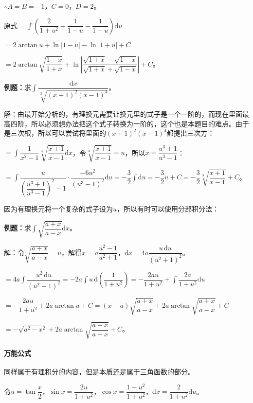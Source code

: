\documentclass[UTF8, 12pt]{ctexart}
\begin{document}
$\therefore A=B=-1$，$C=0$，$D=2$。

原式$=\displaystyle{\int\left(\dfrac{2}{1+u^2}-\dfrac{1}{1-u}-\dfrac{1}{1+u}\right)\textrm{d}u}$

$=2\arctan u+\ln\vert1-u\vert-\ln\vert1+u\vert+C$

$=2\arctan\sqrt{\dfrac{1-x}{1+x}}+\ln\left\vert\dfrac{\sqrt{1+x}-\sqrt{1-x}}{\sqrt{1+x}+\sqrt{1-x}}\right\vert+C$。

\textbf{例题：}求$\displaystyle{\int\dfrac{\textrm{d}x}{\sqrt[3]{(x+1)^2(x-1)^4}}}$。

解：由最开始分析的，有理换元需要让换元里的式子是一个一阶的，而现在里面最高四阶，所以必须想办法把这个式子转换为一阶的，这个也是本题目的难点。由于是三次根，所以可以尝试将里面的$(x+1)^2(x-1)^4$都提出三次方：

$=\displaystyle{\int\dfrac{1}{x^2-1}\sqrt[3]{\dfrac{x+1}{x-1}}\textrm{d}x}$，令$\sqrt[3]{\dfrac{x+1}{x-1}}=u$，所以$x=\dfrac{u^3+1}{u^3-1}$：

$=\displaystyle{\int\dfrac{u}{\left(\dfrac{u^3+1}{u^3-1}\right)^2-1}\cdot\dfrac{-6u^2}{(u^3-1)^2}\textrm{d}u=-\dfrac{3}{2}\int\textrm{d}u}=-\dfrac{3}{2}u+C=-\dfrac{3}{2}\sqrt[3]{\dfrac{x+1}{x-1}}+C $。

因为有理换元将一个复杂的式子设为$u$，所以有时可以使用分部积分法：\medskip

\textbf{例题：}求$\displaystyle{\int\sqrt{\dfrac{a+x}{a-x}}\textrm{d}x}$。\medskip

解：令$\sqrt{\dfrac{a+x}{a-x}}=u$，解得$x=a\dfrac{u^2-1}{u^2+1}$，$\textrm{d}x=4a\dfrac{u\,\textrm{d}u}{(u^2+1)^2}$。

$=\displaystyle{4a\int\dfrac{u^2\,\textrm{d}u}{(u^2+1)^2}=-2a\int u\,\textrm{d}\left(\dfrac{1}{1+u^2}\right)=-\dfrac{2au}{1+u^2}+\int\dfrac{2a}{1+u^2}\textrm{d}u}$

$=-\dfrac{2au}{1+u^2}+2a\arctan u+C=(x-a)\sqrt{\dfrac{a+x}{a-x}}+2a\arctan\sqrt{\dfrac{a+x}{a-x}}+C$

$=-\sqrt{a^2-x^2}+2a\arctan\sqrt{\dfrac{a+x}{a-x}}+C$。

\paragraph{万能公式} \leavevmode \medskip

同样属于有理积分的内容，但是本质还是属于三角函数的部分。

令$u=\tan\dfrac{x}{2}$，$\sin x=\dfrac{2u}{1+u^2}$，$\cos x=\dfrac{1-u^2}{1+u^2}$，$\textrm{d}x=\dfrac{2}{1+u^2}\textrm{d}u$。
\end{document}
